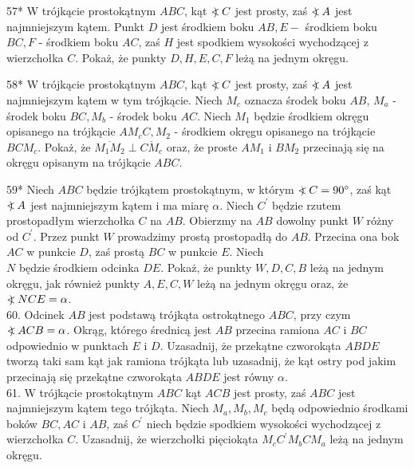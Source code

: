 \documentclass[10pt]{article}
\newcommand\Varangle{\mathop{{<\!\!\!\!\!\text{\small)}}\:}\nolimits}
\begin{document}
57* W trójkącie prostokątnym \(A B C\), kąt \(\Varangle C\) jest prosty, zaś \(\Varangle A\) jest najmniejszym kątem. Punkt \(D\) jest środkiem boku \(A B, E-\) środkiem boku \(B C, F\) - środkiem boku \(A C\), zaś \(H\) jest spodkiem wysokości wychodzącej z wierzchołka \(C\). Pokaż, że punkty \(D, H, E, C, F\) leżą na jednym okręgu.

58* W trójkącie prostokątnym \(A B C\), kąt \(\Varangle C\) jest prosty, zaś \(\Varangle A\) jest najmniejszym kątem w tym trójkącie. Niech \(M_{c}\) oznacza środek boku \(A B\), \(M_{a}\) - środek boku \(B C, M_{b}\) - środek boku \(A C\). Niech \(M_{1}\) będzie środkiem okręgu opisanego na trójkącie \(A M_{c} C, M_{2}\) - środkiem okręgu opisanego na trójkącie \(B C M_{c}\). Pokaż, że \(\overline{M_{1} M_{2}} \perp \overline{C M_{c}}\) oraz, że proste \(A M_{1}\) i \(B M_{2}\) przecinają się na okręgu opisanym na trójkącie \(A B C\).

59* Niech \(A B C\) będzie trójkątem prostokątnym, w którym \(\Varangle C=90^{\circ}\), zaś kąt \(\Varangle A\) jest najmniejszym kątem i ma miarę \(\alpha\). Niech \(C^{\prime}\) będzie rzutem prostopadłym wierzchołka \(C\) na \(A B\). Obierzmy na \(A B\) dowolny punkt \(W\) różny od \(C^{\prime}\). Przez punkt \(W\) prowadzimy prostą prostopadłą do \(A B\). Przecina ona bok \(A C\) w punkcie \(D\), zaś prostą \(B C\) w punkcie \(E\). Niech\\
\(N\) będzie środkiem odcinka \(D E\). Pokaż, że punkty \(W, D, C, B\) leżą na jednym okręgu, jak również punkty \(A, E, C, W\) leżą na jednym okręgu oraz, że \(\Varangle N C E=\alpha\).\\
60. Odcinek \(A B\) jest podstawą trójkąta ostrokątnego \(A B C\), przy czym \(\Varangle A C B=\alpha\). Okrąg, którego średnicą jest \(A B\) przecina ramiona \(A C\) i \(B C\) odpowiednio w punktach \(E\) i \(D\). Uzasadnij, że przekątne czworokąta \(A B D E\) tworzą taki sam kąt jak ramiona trójkąta lub uzasadnij, że kąt ostry pod jakim przecinają się przekątne czworokąta \(A B D E\) jest równy \(\alpha\).\\
61. W trójkącie prostokątnym \(A B C\) kąt \(A C B\) jest prosty, zaś \(A B C\) jest najmniejszym kątem tego trójkąta. Niech \(M_{a}, M_{b}, M_{c}\) będą odpowiednio środkami boków \(B C, A C\) i \(A B\), zaś \(C^{\prime}\) niech będzie spodkiem wysokości wychodzącej z wierzchołka \(C\). Uzasadnij, że wierzchołki pięciokąta \(M_{c} C^{\prime} M_{b} C M_{a}\) leżą na jednym okręgu.
\end{document}
